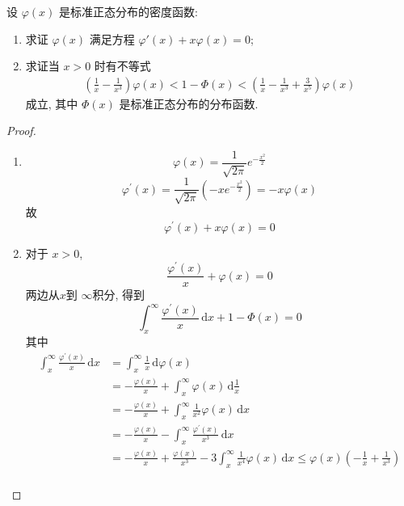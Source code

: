 \documentclass[../main.tex]{subfiles}
\begin{document}
\begin{exercise}{}{}
设 $\varphi(x)$ 是标准正态分布的密度函数:
\begin{enumerate}
    \item 求证 $\varphi(x)$ 满足方程 $\varphi'(x) + x\varphi(x) = 0$;
    \item 求证当 $x > 0$ 时有不等式
    $$\begin{aligned}
    \left(\frac{1}{x} - \frac{1}{x^3}\right)\varphi(x) < 1 - \Phi(x) < \left(\frac{1}{x} - \frac{1}{x^3} + \frac{3}{x^5}\right)\varphi(x)
    \end{aligned}$$
    成立, 其中 $\Phi(x)$ 是标准正态分布的分布函数.
\end{enumerate}
\end{exercise}
\begin{proof}
    \begin{enumerate}
        \item  \[
         \varphi \left( x \right)= \frac{1 }{\sqrt{2 \pi } }e^{-\frac{x^{2} }{2 } }  
        \] \[
         \varphi ^{\prime} \left( x \right)= \frac{1 }{\sqrt{2 \pi } }\left( -xe^{-\frac{x^{2} }{2 } } \right)= -x  \varphi \left( x \right)    
        \]故 \[
         \varphi ^{\prime} \left( x \right)+ x \varphi \left( x \right)= 0  
        \]
        \item 对于 \(  x> 0  \),  \[
        \frac{ \varphi ^{\prime} \left( x \right)  }{x }+  \varphi \left( x \right)= 0  
        \] 两边从\(  x  \)到 \(  \infty  \)积分, 得到  \[
        \int_{x}^{\infty}\frac{ \varphi ^{\prime} \left( x \right)  }{x }\,\mathrm{d} x+ 1- \Phi \left( x \right)= 0  
        \]其中 \[
        \begin{aligned}
        \int_{x}^{\infty}\frac{ \varphi ^{\prime} \left( x \right)  }{x }\,\mathrm{d} x&= \int_{x}^{\infty}\frac{1 }{x }\,\mathrm{d}  \varphi \left( x \right)\\ 
         &=- \frac{ \varphi \left( x \right)  }{x }+ \int_{x}^{\infty}  \varphi \left( x \right)\,\mathrm{d} \frac{1 }{x }\\ 
          &=- \frac{ \varphi \left( x \right)  }{x }+ \int_{x}^{\infty} \frac{1 }{x^{2} }\varphi \left( x \right)\,\mathrm{d} x          \\ 
           &=- \frac{ \varphi \left( x \right)  }{x }- \int_{x}^{\infty} \frac{ \varphi ^{\prime} \left( x \right)  }{x^{3} }\,\mathrm{d} x\\ 
            &= -\frac{ \varphi \left( x \right)  }{x }+  \frac{ \varphi \left( x \right)  }{x^{3} }-3\int_{x}^{\infty}\frac{1 }{x^{4} } \varphi \left( x \right)\,\mathrm{d} x  \le  \varphi \left( x \right)\left( -\frac{1 }{x }+ \frac{1 }{x^{3} }   \right)     \\ 

\end{aligned}\]
\end{enumerate}
\end{proof}
\end{document}
